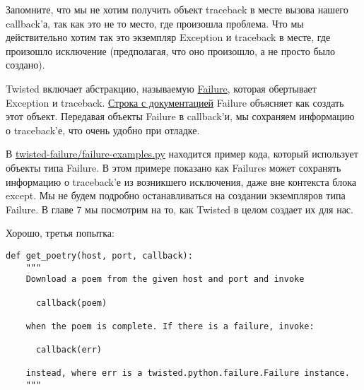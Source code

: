 
Запомните, что мы не хотим получить объект traceback в месте 
вызова нашего callback'а, так как это не то место, где произошла 
проблема. Что мы действительно хотим так это экземпляр Exception и 
traceback в месте, где произошло исключение (предполагая, что оно 
произошло, а не просто было создано).



Twisted включает абстракцию, называемую 
\href{http://twistedmatrix.com/trac/browser/tags/releases/twisted-8.2.0/twisted/python/failure.py#L121}{Failure}, 
которая 
обертывает Exception и traceback. 
\href{http://twistedmatrix.com/trac/browser/tags/releases/twisted-8.2.0/twisted/python/failure.py#L141}{Строка с документацией} 
Failure объясняет как создать этот объект. Передавая объекты Failure в 
callback'и, мы сохраняем информацию о traceback'е, что очень 
удобно при отладке.


В 
\href{http://github.com/jdavisp3/twisted-intro/blob/master/twisted-failure/failure-examples.py}{twisted-failure/failure-examples.py} 
находится пример кода, который использует объекты типа Failure. 
В этом примере показано как Failures может сохранять 
информацию о traceback'е из возникшего исключения, даже вне 
контекста блока except. Мы не будем подробно останавливаться на 
создании экземпляров типа Failure. В главе 7 мы посмотрим на то, 
как Twisted в целом создает их для нас.


Хорошо, третья попытка:

 \begin{verbatim}
def get_poetry(host, port, callback):
    """
    Download a poem from the given host and port and invoke

      callback(poem)

    when the poem is complete. If there is a failure, invoke:

      callback(err)

    instead, where err is a twisted.python.failure.Failure instance.
    """
\end{verbatim} 


